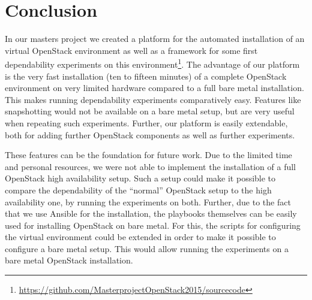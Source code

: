 %
%




\section{Conclusion}
\label{conclusion}

In our masters project we created a platform for the automated installation of an virtual OpenStack environment as well as a framework for some first dependability experiments on this environment\footnote{\url{https://github.com/MasterprojectOpenStack2015/sourcecode}}. The advantage of our platform is the very fast installation (ten to fifteen minutes) of a complete OpenStack environment on very limited hardware compared to a full bare metal installation. This makes running dependability experiments comparatively easy. Features like snapshotting would not be available on a bare metal setup, but are very useful when repeating such experiments. Further, our platform is easily extendable, both for adding further OpenStack components as well as further experiments.

These features can be the foundation for future work. Due to the limited time and personal resources, we were not able to implement the installation of a full OpenStack high availability setup. Such a setup could make it possible to compare the dependability of the ``normal'' OpenStack setup to the high availability one, by running the experiments on both. Further, due to the fact that we use Ansible for the installation, the playbooks themselves can be easily used for installing OpenStack on bare metal. For this, the scripts for configuring the virtual environment could be extended in order to make it possible to configure a bare metal setup. This would allow running the experiments on a bare metal OpenStack installation.
